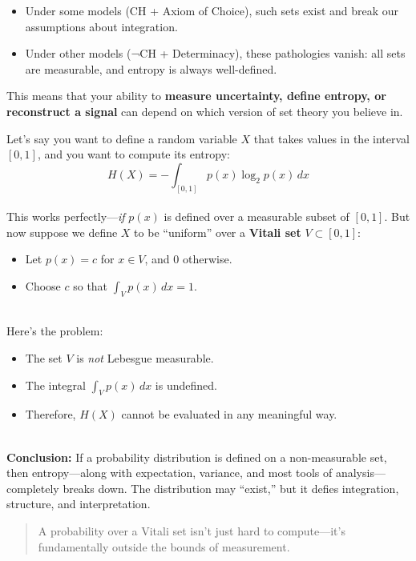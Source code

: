 \begin{itemize}
  \item Under some models (CH + Axiom of Choice), such sets exist and break our assumptions about integration.
  \item Under other models (¬CH + Determinacy), these pathologies vanish: all sets are measurable, and entropy is always well-defined.
\end{itemize}

This means that your ability to \textbf{measure uncertainty, define entropy, or reconstruct a signal} can depend on which version of set theory you believe in.

\begin{example}[title={When Entropy Breaks: A Distribution on a Vitali Set}]
Let’s say you want to define a random variable \( X \) that takes values in the interval \([0,1]\), and you want to compute its entropy:
\[
H(X) = -\int_{[0,1]} p(x) \log_2 p(x)\, dx
\]
\\
This works perfectly—\emph{if} \( p(x) \) is defined over a measurable subset of \([0,1]\). But now suppose we define \( X \) to be “uniform” over a \textbf{Vitali set} \( V \subset [0,1] \):
\begin{itemize}
  \item Let \( p(x) = c \) for \( x \in V \), and 0 otherwise.
  \item Choose \( c \) so that \( \int_V p(x)\, dx = 1 \).
\end{itemize}
\ \\
Here’s the problem:
\begin{itemize}
  \item The set \( V \) is \emph{not} Lebesgue measurable.
  \item The integral \( \int_V p(x)\, dx \) is undefined.
  \item Therefore, \( H(X) \) cannot be evaluated in any meaningful way.
\end{itemize}
\ \\
\textbf{Conclusion:} If a probability distribution is defined on a non-measurable set, then entropy—along with expectation, variance, and most tools of analysis—completely breaks down. The distribution may “exist,” but it defies integration, structure, and interpretation.
\ \\
\begin{quote}
A probability over a Vitali set isn’t just hard to compute—it’s fundamentally outside the bounds of measurement.
\end{quote}
\end{example}

